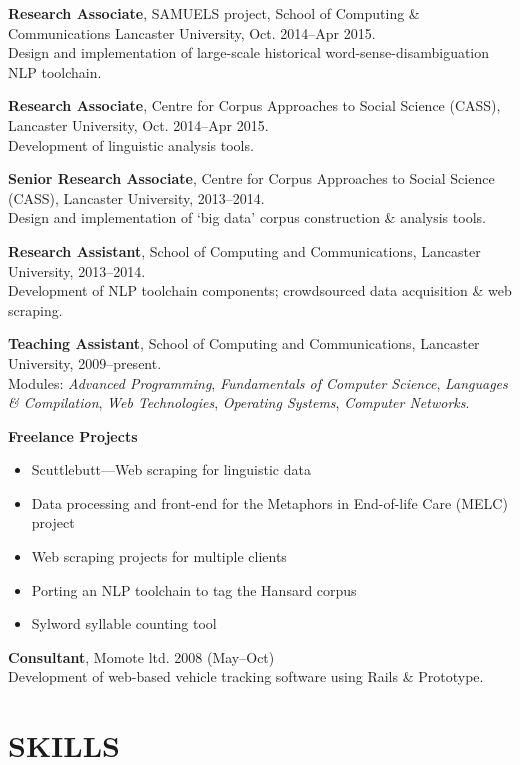 \documentclass{res}
\begin{document}
\begin{resume}
    {\bf Research Associate},
    SAMUELS project, School of Computing \& Communications
    Lancaster University,
    Oct. 2014--Apr 2015.\\
    Design and implementation of large-scale historical word-sense-disambiguation NLP toolchain.


    {\bf Research Associate},
    Centre for Corpus Approaches to Social Science (CASS),
    Lancaster University,
    Oct. 2014--Apr 2015.\\
    Development of linguistic analysis tools.

    {\bf Senior Research Associate},
    Centre for Corpus Approaches to Social Science (CASS),
    Lancaster University,
    2013--2014.\\
    Design and implementation of `big data' corpus construction \& analysis tools.

    {\bf Research Assistant},
    School of Computing and Communications,
    Lancaster University,
    2013--2014.\\
    Development of NLP toolchain components; crowdsourced data acquisition \& web scraping.

    {\bf Teaching Assistant},
    School of Computing and Communications,
    Lancaster University,
    2009--present.\\
    Modules: \textsl{Advanced Programming}, \textsl{Fundamentals of Computer Science}, \textsl{Languages \& Compilation}, \textsl{Web Technologies}, \textsl{Operating Systems}, \textsl{Computer Networks}.

    {\bf Freelance Projects}
    \begin{itemize}
        \item Scuttlebutt---Web scraping for linguistic data
        \item Data processing and front-end for the Metaphors in End-of-life Care (MELC) project
        \item Web scraping projects for multiple clients
        \item Porting an NLP toolchain to tag the Hansard corpus
        \item Sylword syllable counting tool
    \end{itemize}

    {\bf Consultant},
    Momote ltd.
    2008 (May--Oct)\\
    Development of web-based vehicle tracking software using Rails \& Prototype.




\section{SKILLS}
\vspace{0.1in}


\end{resume}
\end{document}
